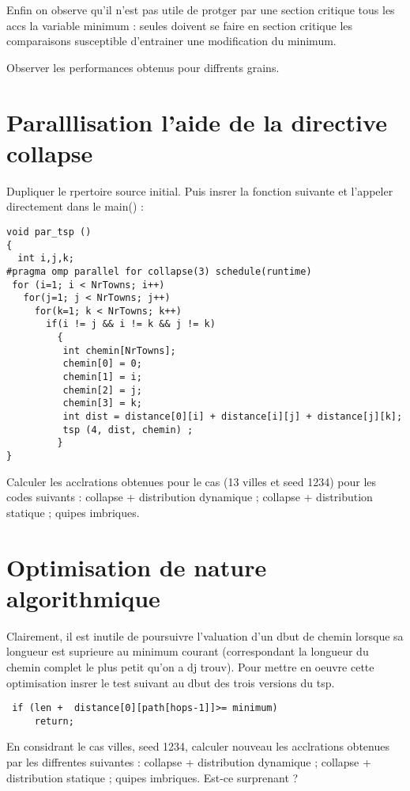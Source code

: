 \documentclass[A4wide]{article}
\begin{document}
Enfin on observe qu'il n'est pas utile de protger par une section
critique tous les accs  la variable minimum : seules doivent se faire
en section critique les comparaisons susceptible d'entrainer une
modification du minimum.

Observer les performances obtenus pour diffrents grains.


\section{Paralllisation  l'aide de la directive collapse}

Dupliquer le rpertoire source initial. Puis insrer la fonction
suivante et l'appeler directement dans le main() :

\begin{verbatim}
void par_tsp ()
{
  int i,j,k;
#pragma omp parallel for collapse(3) schedule(runtime) 
 for (i=1; i < NrTowns; i++)
   for(j=1; j < NrTowns; j++)
     for(k=1; k < NrTowns; k++)
       if(i != j && i != k && j != k)
         {
          int chemin[NrTowns];
          chemin[0] = 0;
          chemin[1] = i;
          chemin[2] = j;
          chemin[3] = k;
          int dist = distance[0][i] + distance[i][j] + distance[j][k];
          tsp (4, dist, chemin) ;
         }
}
\end{verbatim}

Calculer les acclrations obtenues pour le cas (13 villes et seed
1234) pour les codes suivants : collapse + distribution dynamique ;
collapse + distribution statique ; quipes imbriques.


\section{Optimisation de nature algorithmique}

Clairement, il est inutile de poursuivre l'valuation d'un dbut de
chemin lorsque sa longueur est suprieure au minimum courant
(correspondant  la longueur du chemin complet le plus petit qu'on a
dj trouv). Pour mettre en oeuvre cette optimisation insrer le test
suivant au dbut des trois versions du tsp.

\begin{verbatim}
 if (len +  distance[0][path[hops-1]]>= minimum)
     return;
\end{verbatim}



En considrant le cas  villes, seed 1234\fg{}, calculer 
nouveau les acclrations obtenues par les diffrentes suivantes :
collapse + distribution dynamique ; collapse + distribution statique ;
quipes imbriques. Est-ce surprenant ? 
\end{document}
